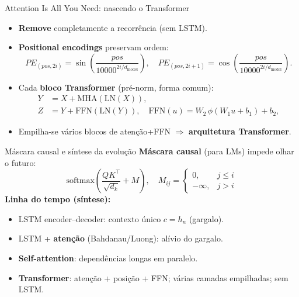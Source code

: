 \documentclass{beamer}
\begin{document}
\begin{frame}{Attention Is All You Need: nascendo o Transformer}
	\begin{itemize}
		\item \textbf{Remove} completamente a recorrência (sem LSTM).
		\item \textbf{Positional encodings} preservam ordem:
		      \[
			      PE_{(pos,2i)}=\sin\!\left(\frac{pos}{10000^{2i/d_{\text{model}}}}\right),\quad
			      PE_{(pos,2i+1)}=\cos\!\left(\frac{pos}{10000^{2i/d_{\text{model}}}}\right).
		      \]
		\item Cada \textbf{bloco Transformer} (pré-norm, forma comum):
		      \[
			      \begin{aligned}
				      Y & = X + \mathrm{MHA}(\mathrm{LN}(X)),                                               \\
				      Z & = Y + \mathrm{FFN}(\mathrm{LN}(Y)),\quad \mathrm{FFN}(u)=W_2\,\phi(W_1u+b_1)+b_2,
			      \end{aligned}
		      \]
		\item Empilha-se vários blocos de atenção+FFN $\Rightarrow$ \textbf{arquitetura Transformer}.
	\end{itemize}
\end{frame}

\begin{frame}{Máscara causal e síntese da evolução}
	\textbf{Máscara causal} (para LMs) impede olhar o futuro:
	\[
		\mathrm{softmax}\!\left(\frac{QK^\top}{\sqrt{d_k}}+M\right),
		\quad
		M_{ij}=\begin{cases}
			0,       & j\le i \\
			-\infty, & j>i
		\end{cases}
	\]
	\textbf{Linha do tempo (síntese):}
	\begin{itemize}
		\item LSTM encoder--decoder: contexto único $c=h_n$ (gargalo).
		\item LSTM + \textbf{atenção} (Bahdanau/Luong): alívio do gargalo.
		\item \textbf{Self-attention}: dependências longas em paralelo.
		\item \textbf{Transformer}: atenção + posição + FFN; várias camadas empilhadas; sem LSTM.
	\end{itemize}
\end{frame}

\end{document}

